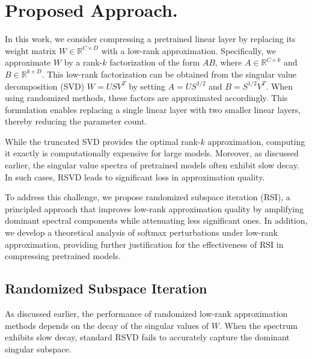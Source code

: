 \documentclass[twoside,leqno,onecolumn]{article}
\begin{document}
\section{Proposed Approach.}
In this work, we consider compressing a pretrained linear layer by replacing its weight matrix $W \in \mathbb{R}^{C \times D}$ with a low-rank approximation. Specifically, we approximate $W$ by a rank-$k$ factorization of the form $AB$, where $A \in \mathbb{R}^{C \times k}$ and $B \in \mathbb{R}^{k \times D}$. This low-rank factorization can be obtained from the singular value decomposition (SVD) $W = U S V^T$ by setting $A = U S^{1/2}$ and $B = S^{1/2} V^T$. When using randomized methods, these factors are approximated accordingly. This formulation enables replacing a single linear layer with two smaller linear layers, thereby reducing the parameter count.

While the truncated SVD provides the optimal rank-$k$ approximation, computing it exactly is computationally expensive for large models. Moreover, as discussed earlier, the singular value spectra of pretrained models often exhibit slow decay. In such cases, RSVD leads to significant loss in approximation quality.

To address this challenge, we propose randomized subspace iteration (RSI), a principled approach that improves low-rank approximation quality by amplifying dominant spectral components while attenuating less significant ones. In addition, we develop a theoretical analysis of softmax perturbations under low-rank approximation, providing further justification for the effectiveness of RSI in compressing pretrained models.

\subsection{Randomized Subspace Iteration}
As discussed earlier, the performance of randomized low-rank approximation methods depends on the decay of the singular values of \( W \). When the spectrum exhibits slow decay, standard RSVD fails to accurately capture the dominant singular subspace.
\end{document}
